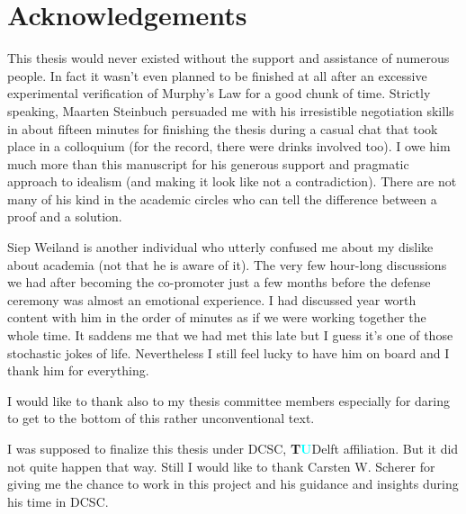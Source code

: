 \chapter{Acknowledgements}
This thesis would never existed without the support and assistance of numerous people. In fact it wasn't even planned to be 
finished at all after an excessive experimental verification of Murphy's Law for a good chunk of time. Strictly speaking, Maarten Steinbuch 
persuaded me with his irresistible negotiation skills in about fifteen minutes for finishing the thesis during a casual chat that took 
place in a colloquium (for the record, there were drinks involved too). I owe him much more than this manuscript for his generous support 
and pragmatic approach to idealism (and making it look like not a contradiction). There are not many of his kind in the academic circles 
who can tell the difference between a proof and a solution.

Siep Weiland is another individual who utterly confused me about my dislike about academia (not that he is aware of it). The very few
hour-long discussions we had after becoming the co-promoter just a few months before the defense ceremony was almost an emotional 
experience. I had discussed year worth content with him in the order of minutes as if we were working together the whole time. It saddens 
me that we had met this late but I guess it's one of those stochastic jokes of life. Nevertheless I still feel lucky to have him on board 
and I thank him for everything. 

I would like to thank also to my thesis committee members especially for daring to get to the bottom of this rather unconventional text. 

I was supposed to finalize this thesis under DCSC, \textsf{\textbf{T\textcolor{cyan}{U}}Delft} affiliation. But it did not quite happen that 
way. Still I would like to thank Carsten W. Scherer for giving me the chance to work in this project and his guidance and insights during 
his time in DCSC. 

